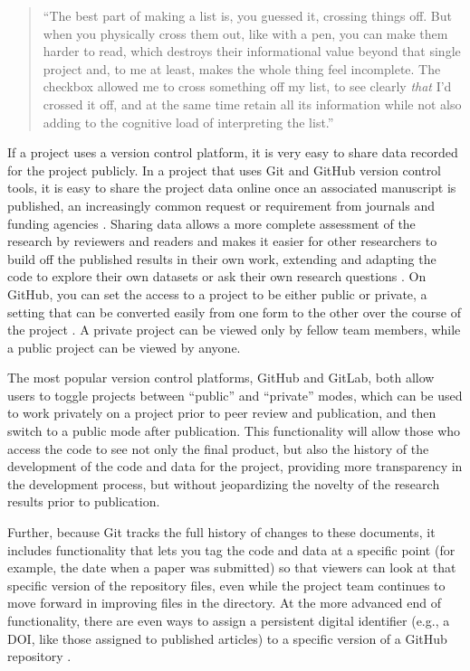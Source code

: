 \documentclass[]{tufte-book}
\begin{document}
\begin{quote}
``The best part of making a list is, you guessed it, crossing things off. But when you
physically cross them out, like with a pen, you can make them harder to read, which
destroys their informational value beyond that single project and, to me at least, makes
the whole thing feel incomplete. The checkbox allowed me to cross something off my list,
to see clearly \emph{that} I'd crossed it off, and at the same time retain all its
information while not also adding to the cognitive load of interpreting the list.''
\citep{savage2020every}
\end{quote}

If a project uses a version control platform, it is very easy to share data recorded
for the project publicly. In a project that uses Git and GitHub version control
tools, it is easy to share the project data online once an associated manuscript
is published, an increasingly common request or requirement from journals and
funding agencies \citep{blischak2016quick}. Sharing data allows a more complete
assessment of the research by reviewers and readers and makes it easier for
other researchers to build off the published results in their own work,
extending and adapting the code to explore their own datasets or ask their own
research questions \citep{perez2016ten}. On GitHub, you can set the access to a
project to be either public or private, a setting that can be converted easily from one
form to the other over the course of the project \citep{metz2015github}. A private
project can be viewed only by fellow team members, while a public project can be
viewed by anyone.

The most popular version control platforms, GitHub and GitLab, both allow users
to toggle projects between ``public'' and ``private'' modes, which can be used to
work privately on a project prior to peer review and publication, and then
switch to a public mode after publication. This functionality will allow those
who access the code to see not only the final product, but also the history of
the development of the code and data for the project, providing more
transparency in the development process, but without jeopardizing the novelty of
the research results prior to publication.

Further, because Git tracks the full history of changes to
these documents, it includes functionality that lets you tag the code and data
at a specific point (for example, the date when a paper was submitted) so that
viewers can look at that specific version of the repository files, even while
the project team continues to move forward in improving files in the directory.
At the more advanced end of functionality, there are even ways to assign a
persistent digital identifier (e.g., a DOI, like those assigned to published articles)
to a specific version of a GitHub repository \citep{perez2016ten}.
\end{document}
